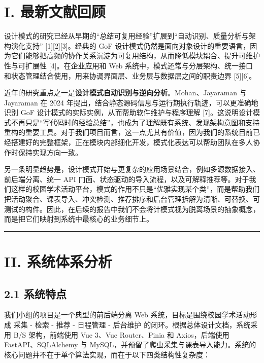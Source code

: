 \section{I. 最新文献回顾}\label{i.-ux6700ux65b0ux6587ux732eux56deux987e}

设计模式的研究已经从早期的``总结可复用经验''扩展到``自动识别、质量分析与架构演化支持''
{[}1{]}{[}2{]}{[}3{]}。经典的 GoF
设计模式仍然是面向对象设计的重要语言，因为它们能够把高频的协作关系沉淀为可复用结构，从而降低模块耦合、提升可维护性与可扩展性
{[}4{]}。在企业应用和 Web
系统中，模式还常与分层架构、统一接口和状态管理结合使用，用来协调界面层、业务层与数据层之间的职责边界
{[}5{]}{[}6{]}。

近年的研究重点之一是\textbf{设计模式自动识别与逆向分析}。Mohan、Jayaraman
与 Jayaraman 在 2024
年提出，结合静态源码信息与运行期执行轨迹，可以更准确地识别 GoF
设计模式的实际实例，从而帮助软件维护与程序理解
{[}7{]}。这说明设计模式不再只是``写代码时的经验总结''，也成为了理解既有系统、发现架构意图和支持重构的重要工具。对于我们项目而言，这一点尤其有价值，因为我们的系统目前已经搭建好的完整框架，正在模块内部细化开发，模式化表达可以帮助团队在多人协作时保持实现方向一致。

另一条明显趋势是，设计模式开始与更复杂的应用场景结合，例如多源数据接入、前后端分离、统一
API
门面、状态驱动的导入流程，以及可解释推荐等。对于我们这样的校园学术活动平台，模式的作用不只是``优雅实现某个类''，而是帮助我们把活动聚合、课表导入、冲突检测、推荐排序和后台管理拆解为清晰、可替换、可测试的构件。因此，在后续的报告中我们不会将计模式视为脱离场景的抽象概念，而是把它们映射到系统中最核心的业务细节上。

\begin{center}\rule{0.5\linewidth}{0.5pt}\end{center}

\section{II.
系统体系分析}\label{ii.-ux7cfbux7edfux4f53ux7cfbux5206ux6790}

\subsection{2.1 系统特点}\label{ux7cfbux7edfux7279ux70b9}

我们小组的项目是一个典型的前后端分离 Web
系统，目标是围绕校园学术活动形成 采集 - 检索 - 推荐 - 日程管理 -
后台维护 的闭环。根据总体设计文档，系统采用 B/S 架构，前端使用 Vue
3、Vue Router、Pinia 和 Axios，后端使用 FastAPI、SQLAlchemy 与
MySQL，并预留了爬虫采集与课表导入能力。系统的核心问题并不在于单个算法实现，而在于以下四类结构性复杂度：

